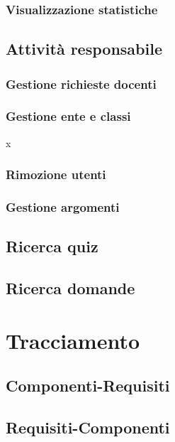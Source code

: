 \documentclass[a4paper, titlepage]{article}
\begin{document}
\subsubsection{Visualizzazione statistiche}





\subsection{Attività responsabile}

\subsubsection{Gestione richieste docenti}

\subsubsection{Gestione ente e classi} x



\subsubsection{Rimozione utenti}

\subsubsection{Gestione argomenti}

\subsection{Ricerca quiz}

\subsection{Ricerca domande}




\section{Tracciamento}

\subsection{Componenti-Requisiti}


\subsection{Requisiti-Componenti}

\end{document}
